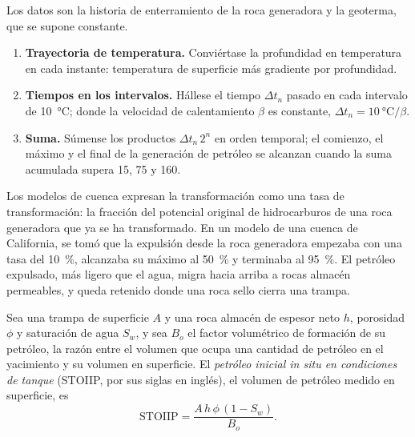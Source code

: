 \begin{method}\label{met:b2:energy-geology:tti}
Los datos son la historia de enterramiento de la roca generadora y la geoterma, que se supone constante.
\begin{enumerate}
  \item \textbf{Trayectoria de temperatura.} Conviértase la profundidad en temperatura en cada instante: temperatura de superficie
        más gradiente por profundidad.
  \item \textbf{Tiempos en los intervalos.} Hállese el tiempo $\Delta t_n$ pasado en cada intervalo de
        \qty{10}{\celsius}; donde la velocidad de calentamiento $\beta$ es constante, $\Delta t_n = \qty{10}{\celsius}/\beta$.
  \item \textbf{Suma.} Súmense los productos $\Delta t_n\,2^n$ en orden temporal; el comienzo, el máximo y el
        final de la generación de petróleo se alcanzan cuando la suma acumulada supera 15, 75 y 160.
\end{enumerate}
\end{method}

Los modelos de cuenca expresan la transformación como una tasa de transformación: la fracción del potencial
original de hidrocarburos de una roca generadora que ya se ha transformado. En un modelo de una cuenca de California,
se tomó que la expulsión desde la roca generadora empezaba con una tasa del \qty{10}{\percent}, alcanzaba su máximo al
\qty{50}{\percent} y terminaba al \qty{95}{\percent}. El petróleo expulsado, más ligero que el agua,
migra hacia arriba a rocas almacén permeables, y queda retenido donde una roca sello cierra una trampa.

\begin{proposition}\label{prop:b2:energy-geology:volumetrics}
Sea una trampa de superficie $A$ y una roca almacén de espesor neto $h$, porosidad $\phi$ y saturación de agua
$S_w$, y sea $B_o$ el factor volumétrico de formación de su petróleo, la razón entre el volumen que ocupa una cantidad
de petróleo en el yacimiento y su volumen en superficie. El \emph{petróleo inicial in situ en
condiciones de tanque} (STOIIP, por sus siglas en inglés), el volumen de petróleo medido en superficie, es
\begin{equation}
\mathrm{STOIIP} = \frac{A\,h\,\phi\,(1 - S_w)}{B_o} .
\label{eq:b2:energy-geology:stoiip}
\end{equation}
\end{proposition}

